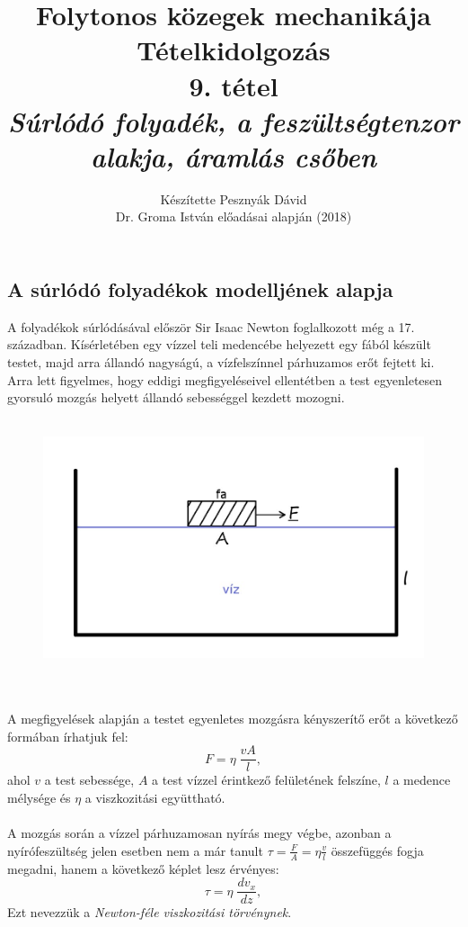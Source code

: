 \documentclass[a4paper, titlepage]{article}
\begin{document}
\begin{titlepage}
	\title{\textbf{Folytonos közegek mechanikája}\\
	Tételkidolgozás\\
	9. tétel\\
	\textit{Súrlódó folyadék, a feszültségtenzor alakja, áramlás csőben}}
	\author{Készítette Pesznyák Dávid\\
	Dr. Groma István előadásai alapján (2018)}
	\date{}
\end{titlepage}
\maketitle
\newpage
\subsection*{A súrlódó folyadékok modelljének alapja}
A folyadékok súrlódásával először Sir Isaac Newton foglalkozott még a 17. században. Kísérletében egy vízzel teli medencébe helyezett egy fából készült testet, majd arra állandó nagyságú, a vízfelszínnel párhuzamos erőt fejtett ki. Arra lett figyelmes, hogy eddigi megfigyeléseivel ellentétben a test egyenletesen gyorsuló mozgás helyett állandó sebességgel kezdett  mozogni.\\\\
\begin{figure}[h]
\begin{center}
\includegraphics[scale=0.3]{Newton.JPG}
\end{center}
\end{figure}
\\\\A megfigyelések alapján a testet egyenletes mozgásra kényszerítő erőt a következő formában írhatjuk fel:
\begin{equation}
F=\eta\; \frac{v A}{l},
\end{equation}
ahol $v$ a test sebessége, $A$ a test vízzel érintkező felületének felszíne, $l$ a medence mélysége és $\eta$ a viszkozitási együttható.\\\\
A mozgás során a vízzel párhuzamosan nyírás megy végbe, azonban a nyírófeszültség jelen esetben nem a már tanult $\tau=\frac{F}{A}=\eta \frac{v}{l}$ összefüggés fogja megadni, hanem a következő képlet lesz érvényes:
\begin{equation}
\tau=\eta\; \frac{dv_x}{dz},
\end{equation}
Ezt nevezzük a \textit{Newton-féle viszkozitási törvénynek}.
\end{document}
